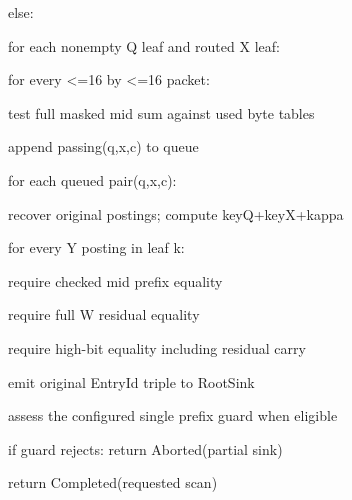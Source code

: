 \documentclass[10pt,letterpaper]{article}
\begin{document}
{\noindent\hspace*{8em}else:\par

\noindent\hspace*{12em}for each nonempty Q leaf and routed X leaf:\par

\noindent\hspace*{16em}for every <=16 by <=16 packet:\par

\noindent\hspace*{20em}test full masked mid sum against used byte tables\par

\noindent\hspace*{20em}append passing(q,x,c) to queue\par

\noindent\hspace*{8em}for each queued pair(q,x,c):\par

\noindent\hspace*{12em}recover original postings; compute keyQ+keyX+kappa\par

\noindent\hspace*{12em}for every Y posting in leaf k:\par

\noindent\hspace*{16em}require checked mid prefix equality\par

\noindent\hspace*{16em}require full W residual equality\par

\noindent\hspace*{16em}require high-bit equality including residual carry\par

\noindent\hspace*{16em}emit original EntryId triple to RootSink\par

\noindent\hspace*{8em}assess the configured single prefix guard when eligible\par

\noindent\hspace*{8em}if guard rejects: return Aborted(partial sink)\par

\noindent\hspace*{0em}return Completed(requested scan)\par

}
\end{document}
